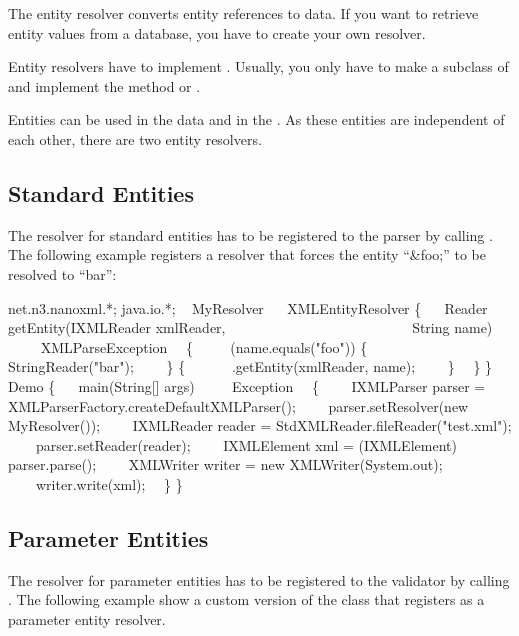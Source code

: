 The entity resolver converts entity references to \XML{} data.
If you want  to retrieve entity values from a database, you have to create your own resolver.

Entity resolvers have to implement .
Usually, you only have to make a subclass of  and implement the method  or .

Entities can be used in the \XML{} data and in the .
As these entities are independent of each other, there are two entity resolvers.


\subsection{Standard Entities}

The resolver for standard entities has to be registered to the parser by calling .
The following example registers a resolver that forces the entity ``\&foo;'' to be resolved to ``bar'':

\begin{example}
 net.n3.nanoxml.*;
 java.io.*;
~
 MyResolver
~~ XMLEntityResolver
\{
~~ Reader getEntity(IXMLReader xmlReader,
~~~~~~~~~~~~~~~~~~~~~~~~~~String name)
~~~~ XMLParseException
~~\{
~~~~ (name.equals("foo")) \{
~~~~~~ StringReader("bar");
~~~~\}  \{
~~~~~~.getEntity(xmlReader, name);
~~~~\}
~~\}
\}
~
 Demo
\{
~~ main(String[] args)
~~~~ Exception
~~\{
~~~~IXMLParser parser = XMLParserFactory.createDefaultXMLParser();
~~~~parser.setResolver(new MyResolver());
~~~~IXMLReader reader = StdXMLReader.fileReader("test.xml");
~~~~parser.setReader(reader);
~~~~IXMLElement xml = (IXMLElement) parser.parse();
~~~~XMLWriter writer = new XMLWriter(System.out);
~~~~writer.write(xml);
~~\}
\}
\end{example}


\subsection{Parameter Entities}

The resolver for parameter entities has to be registered to the validator by calling .
The following example show a custom version of the  class that registers  as a parameter entity resolver.

